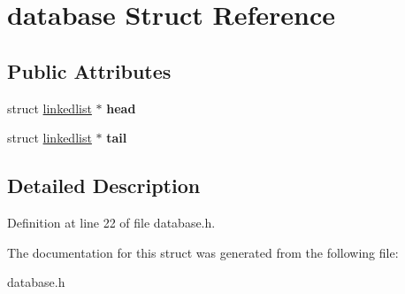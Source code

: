 \hypertarget{structdatabase}{
\section{database Struct Reference}
\label{structdatabase}
}
\subsection*{Public Attributes}
\begin{DoxyCompactItemize}
\item 
\hypertarget{structdatabase_aa2c775182757df7cf224b6088aeaea02}{
struct \hyperlink{structlinkedlist}{linkedlist} $\ast$ {\bfseries head}}
\label{structdatabase_aa2c775182757df7cf224b6088aeaea02}

\item 
\hypertarget{structdatabase_a516c0890ac05393f5f2e18cfd520eed4}{
struct \hyperlink{structlinkedlist}{linkedlist} $\ast$ {\bfseries tail}}
\label{structdatabase_a516c0890ac05393f5f2e18cfd520eed4}

\end{DoxyCompactItemize}


\subsection{Detailed Description}


Definition at line 22 of file database.h.



The documentation for this struct was generated from the following file:\begin{DoxyCompactItemize}
\item 
database.h\end{DoxyCompactItemize}
